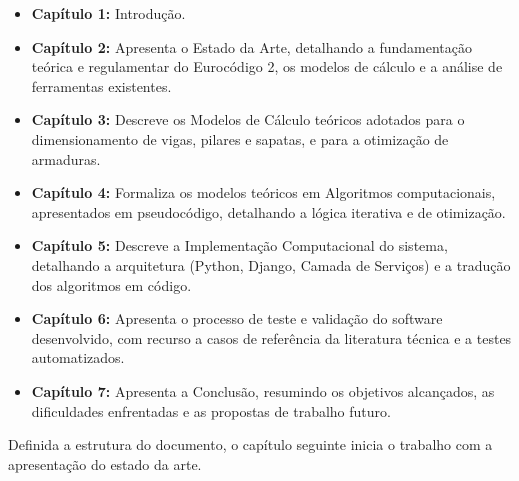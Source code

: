 \begin{itemize}
    \item \textbf{Capítulo 1:} Introdução.
    \item \textbf{Capítulo 2:} Apresenta o Estado da Arte, detalhando a fundamentação teórica e regulamentar do Eurocódigo 2, os modelos de cálculo e a análise de ferramentas existentes.
    \item \textbf{Capítulo 3:} Descreve os Modelos de Cálculo teóricos adotados para o dimensionamento de vigas, pilares e sapatas, e para a otimização de armaduras.
    \item \textbf{Capítulo 4:} Formaliza os modelos teóricos em Algoritmos computacionais, apresentados em pseudocódigo, detalhando a lógica iterativa e de otimização.
    \item \textbf{Capítulo 5:} Descreve a Implementação Computacional do sistema, detalhando a arquitetura (Python, Django, Camada de Serviços) e a tradução dos algoritmos em código.
    \item \textbf{Capítulo 6:} Apresenta o processo de teste e validação do software desenvolvido, com recurso a casos de referência da literatura técnica e a testes automatizados.
    \item \textbf{Capítulo 7:} Apresenta a Conclusão, resumindo os objetivos alcançados, as dificuldades enfrentadas e as propostas de trabalho futuro.
\end{itemize}

Definida a estrutura do documento, o capítulo seguinte inicia o trabalho com a apresentação do estado da arte.